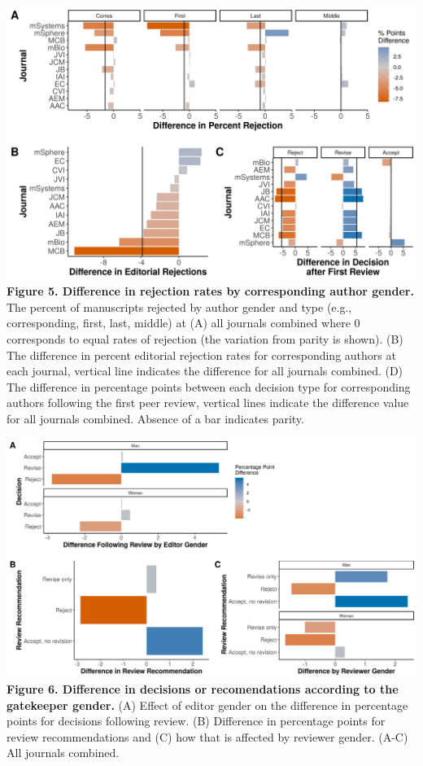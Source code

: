 \documentclass[11pt,]{article}
\begin{document}
\includegraphics{Figure_4.png} \textbf{Figure 5. Difference in rejection
rates by corresponding author gender.} The percent of manuscripts
rejected by author gender and type (e.g., corresponding, first, last,
middle) at (A) all journals combined where 0 corresponds to equal rates
of rejection (the variation from parity is shown). (B) The difference in
percent editorial rejection rates for corresponding authors at each
journal, vertical line indicates the difference for all journals
combined. (D) The difference in percentage points between each decision
type for corresponding authors following the first peer review, vertical
lines indicate the difference value for all journals combined. Absence
of a bar indicates parity.

\newpage

\includegraphics{Figure_5.png} \textbf{Figure 6. Difference in decisions
or recomendations according to the gatekeeper gender.} (A) Effect of
editor gender on the difference in percentage points for decisions
following review. (B) Difference in percentage points for review
recommendations and (C) how that is affected by reviewer gender. (A-C)
All journals combined.
\end{document}
